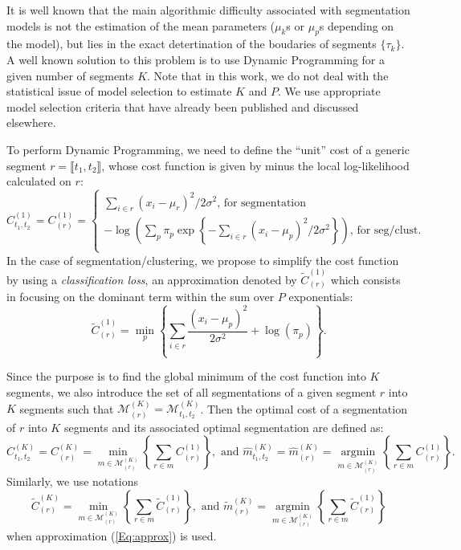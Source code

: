 \documentclass[article,10pt]{llncs}
\begin{document}
It is well known that the main algorithmic difficulty associated with segmentation models is not the estimation of the mean parameters ($\mu_k$s or $\mu_p$s depending on the model), but lies in the exact detertination of the boudaries of segments $\{\tau_k\}$. A well known solution to this problem is to use Dynamic Programming for a given number of segments $K$. Note that in this work, we do not deal with the statistical issue of model selection to estimate $K$ and $P$. We use appropriate model selection criteria that have already been published and discussed elsewhere.

To perform Dynamic Programming, we need to define the ``unit'' cost of a generic segment $r = \llbracket t_1, t_2 \rrbracket$, whose cost function is given by minus the local log-likelihood calculated on $r$:
$$ C_{t_1, t_2}^{(1)} =C_{(r)}^{(1)} = 
\begin{cases}
\sum_{i \in r} (x_i - \mu_r)^2/2 \sigma^2 \text{, for segmentation}  \\
-\log\left(\sum_p \pi_p \exp \left\{ - \sum_{i \in r} (x_i - \mu_p)^2 / 2 \sigma^2 \right\}\right) \text{, for seg/clust}.\\
\end{cases}
$$ 
In the case of segmentation/clustering, we propose to simplify the cost function by using a \textit{classification loss}, an approximation denoted by $\widetilde{C}_{(r)}^{(1)}$ which consists in focusing on the dominant term within the sum over $P$ exponentials:
\begin{equation}
\label{Eq:approx}
\widetilde{C}_{(r)}^{(1)}= \min_p \left\{ \sum_{i \in r}\frac{(x_i - \mu_p)^2} {2\sigma^2 } + \log(\pi_p)\right\}.
\end{equation}

Since the purpose is to find the global minimum of the cost function into $K$ segments, we also introduce the set of all segmentations of a given segment $r$ into $K$ segments such that $\mathcal{M}^{(K)}_{(r)} = \mathcal{M}^{(K)}_{t_1, t_2}$. Then the optimal cost of a segmentation of $r$ into $K$ segments and its associated optimal segmentation are defined as:
$$
C_{t_1, t_2}^{(K)} = C_{(r)}^{(K)} = \min_{m \in \mathcal{M}^{(K)}_{(r)}} \left\{ \sum_{r \in m} C^{(1)}_{(r)} \right\}, 
\text{ and }
\widehat{m}_{t_1, t_2}^{(K)} = \widehat{m}_{(r)}^{(K)} = \underset{m \in \mathcal{M}^{(K)}_{(r)}}{\operatorname{argmin}} \left\{ \sum_{r \in m} C^{(1)}_{(r)} \right\}.
$$
Similarly, we use notations 
$$
\widetilde{C}_{(r)}^{(K)} =\min_{m \in \mathcal{M}^{(K)}_{(r)}} \left\{ \sum_{r \in m} \widetilde{C}^{(1)}_{(r)} \right\}, \text{ and }
\widetilde{m}_{(r)}^{(K)} = \underset{m \in \mathcal{M}^{(K)}_{(r)}}{\operatorname{argmin}} \left\{ \sum_{r \in m} \widetilde{C}^{(1)}_{(r)} \right\}
$$
when approximation (\ref{Eq:approx}) is used.\\
\end{document}
